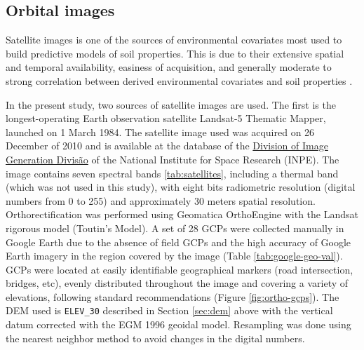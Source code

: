 \tocless\subsection{Orbital images}\label{sec:sat}

Satellite images is one of the sources of environmental covariates most used to build predictive models of soil properties. This is due to their extensive spatial and temporal availability, easiness of acquisition, and generally moderate to strong correlation between derived environmental covariates and soil properties \cite{BishopEtAl2006, Grunwald2009}.

In the present study, two sources of satellite images are used. The first is the longest-operating Earth observation satellite Landsat-5 Thematic Mapper, launched on 1 March 1984. The satellite image used was acquired on 26 December of 2010 and is available at the database of the \href{http://www.dgi.inpe.br/CDSR/}{Division of Image Generation Divisão} of the National Institute for Space Research (INPE). The image contains seven spectral bands \ref{tab:satellites}, including a thermal band (which was not used in this study), with eight bits radiometric resolution (digital numbers from 0 to 255) and approximately 30 meters spatial resolution. Orthorectification was performed using Geomatica\textregistered{} OrthoEngine\textregistered{} with the Landsat rigorous model (Toutin's Model). A set of 28 GCPs were collected manually in Google Earth\textregistered{} due to the absence of field GCPs and the high accuracy of Google Earth\textregistered{} imagery in the region covered by the image (Table \ref{tab:google-geo-val}). GCPs were located at easily identifiable geographical markers (road intersection, bridges, etc), evenly distributed throughout the image and covering a variety of elevations, following standard recommendations \citep{PCIGeomatics2007} (Figure \ref{fig:ortho-gcps}). The DEM used is \texttt{ELEV\_30} described in Section \ref{sec:dem} above with the vertical datum corrected with the EGM 1996 geoidal model. Resampling was done using the nearest neighbor method to avoid changes in the digital numbers.


